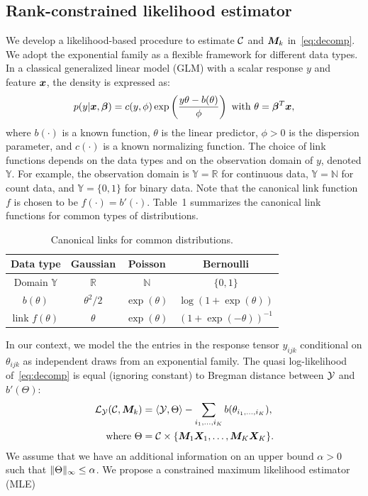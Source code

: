 \documentclass[12pt]{article}
\theoremstyle{plain}
\theoremstyle{definition}
\begin{document}
\subsection{Rank-constrained likelihood estimator}
We develop a likelihood-based procedure to estimate $\mathcal{C}$ and $\bm M_k$ in~\eqref{eq:decomp}. We adopt the exponential family as a flexible framework for different data types. In a classical generalized linear model (GLM) with a scalar response $y$ and feature $\bm x$, the density is expressed as:
\[
p(y|\bm x, \boldsymbol{\beta})=c(y,\phi)\exp\left({y\theta- b(\theta) \over \phi}\right)\ \text{with}\ \theta=\boldsymbol{\beta}^T\bm x,
\]
where $b(\cdot)$ is a known function, $\theta$ is the linear predictor, $\phi>0$ is the dispersion parameter, and $c(\cdot)$ is a known normalizing function. The choice of link functions depends on the data types and on the observation domain of $y$, denoted $\mathbb{Y}$. For example, the observation domain is $\mathbb{Y}=\mathbb{R}$ for continuous data, $\mathbb{Y}=\mathbb{N}$ for count data, and  $\mathbb{Y}=\{0,1\}$ for binary data. 
Note that the canonical link function $f$ is chosen to be $f(\cdot)=b'(\cdot)$. Table~1 summarizes the canonical link functions for common types of distributions. 

\begin{table}[htb]
\centering
\begin{tabular}{c|ccc}
Data type &Gaussian & Poisson& Bernoulli\\
\hline
Domain $\mathbb{Y}$& $\mathbb{R}$&$\mathbb{N}$&$\{0,1\}$\\
 $b(\theta)$&$\theta^2/2$& $\exp(\theta)$&$\log (1+\exp(\theta))$\\
 link $f(\theta)$&$\theta$&$\exp(\theta)$&$(1+\exp(-\theta))^{-1}$
\end{tabular}
\caption{Canonical links for common distributions.}\label{table:link}
\end{table}


In our context, we model the the entries in the response tensor $y_{ijk}$ conditional on $\theta_{ijk}$ as independent draws from an exponential family. The quasi log-likelihood of~\eqref{eq:decomp} is equal (ignoring constant) to Bregman distance between $\mathcal{Y}$ and $b'(\Theta)$:
\begin{align}
\mathcal{L}_{\mathcal{Y}}(\mathcal{C},\bm M_k)&=\langle \mathcal{Y}, \Theta \rangle - \sum_{i_1,\ldots,i_K} b(\theta_{i_1,\ldots,i_K}),\\
\text{where}\ \Theta&=\mathcal{C}\times\{\bm M_1\bm X_1,\ldots,\bm M_K\bm X_K\}.
\end{align}
We assume that we have an additional information on an upper bound $\alpha>0$ such that $\lVert\Theta\rVert_\infty\leq \alpha$. We propose a constrained maximum likelihood estimator (MLE)
\end{document}
